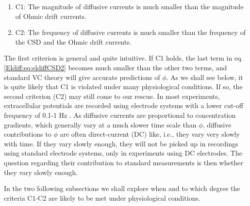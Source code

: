 \begin{enumerate}
\item C1: The magnitude of diffusive currents is much smaller than the magnitude of Ohmic drift currents.
\item C2: The frequency of diffusive currents is much smaller than the frequency of the CSD and the Ohmic drift currents. 
\end{enumerate}

The first criterion is general and quite intuitive. If C1 holds, the last term in eq. \ref{Eldiff:eq:eldiffCSD2} becomes much smaller than the other two terms, and standard VC theory will give accurate predictions of $\phi$. As we shall see below, it is quite likely that C1 is violated under many physiological conditions. If so, the second criterion (C2) may still come to our rescue. In most experiments, extracellular potentials are recorded using electrode systems with a lower cut-off frequency of 0.1-1 Hz \citep{Einevoll2007}. As diffusive currents are proportional to concentration gradients, which generally vary at a much slower time scale than $\phi$, diffusive contributions to $\phi$ are often direct-current (DC) like, i.e., they vary very slowly with time. If they vary slowly enough, they will not be picked up in recordings using standard electrode systems, only in experiments using DC electrodes. The question regarding their contribution to standard measurements is then whether they vary slowly enough. 

In the two following subsections we shall explore when and to which degree the criteria C1-C2 are likely to be met under physiological conditions.

